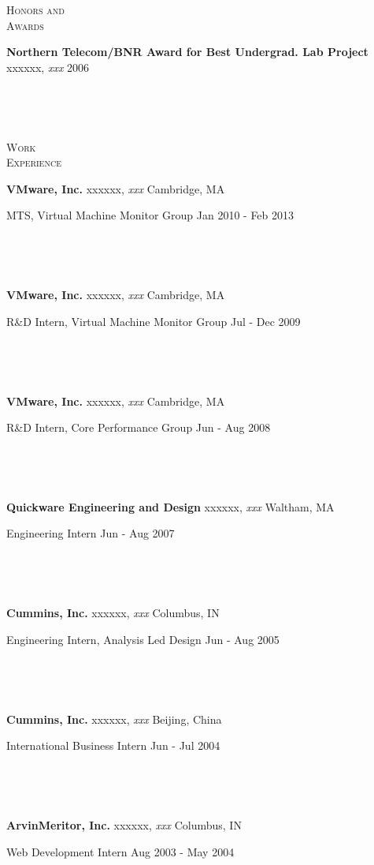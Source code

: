 \documentclass[10pt,times]{report}
\newlength{\sectiongap}
\newlength{\entrygap}
\newlength{\sectioncolwidth}
\newlength{\colgap}
\newlength{\stuffwidth}
\def\ifEqString#1#2{\def\testa{#1}\def\testb{#2}%
  \ifx\testa\testb}
\newenvironment{rtable}{
  \begin{minipage}{\textwidth}
  }{
  \end{minipage}
}
\newenvironment{rentry}[3][xxx]{
  \begin{minipage}[t]{\hsize}
    \textbf{#2}\ifEqString{#1}{xxx}\relax\else, \textit{#1}\fi
    \hspace{\stretch{1}} #3 \\
  }{
    \removelastskip
  \end{minipage}
  \\[\entrygap]  %
}
\newcommand{\rline}[2]{
  \begin{minipage}[t]{\hsize}
    #1 \hspace{\stretch{1}} #2
  \end{minipage} \\
}
\newenvironment{rsection}[1]{
  \begin{minipage}[t]{\sectioncolwidth}
    \textsc{#1}
  \end{minipage}
  \hspace{\colgap}
  \begin{minipage}[t]{\stuffwidth}
  }{
    \removelastskip
  \end{minipage}
  \\[\sectiongap]
}
\begin{document}
\begin{rtable}
\begin{rsection}{Honors and\\Awards}
    \begin{rentry}{Northern Telecom/BNR Award for Best Undergrad. Lab Project}{2006}
    \end{rentry}
  \end{rsection}
  \vspace{1.0em}
  \begin{rsection}{Work\\Experience}
    \begin{rentry}{VMware, Inc.}{Cambridge, MA}      
      \rline{MTS, Virtual Machine Monitor
        Group}{Jan 2010 - Feb 2013}
      \vspace{-.5em}
    \end{rentry}
    \begin{rentry}{VMware, Inc.}{Cambridge, MA}      
      \rline{R\&D Intern, Virtual Machine Monitor Group}{Jul - Dec 2009}
      \vspace{-.5em}
    \end{rentry}
    \begin{rentry}{VMware, Inc.}{Cambridge, MA}      
      \rline{R\&D Intern, Core Performance Group}{Jun - Aug 2008}
      \vspace{-.5em}
    \end{rentry}
    \begin{rentry}{Quickware Engineering and Design}{Waltham, MA}
      \rline{Engineering Intern}{Jun - Aug 2007} 
      \vspace{-.5em}
    \end{rentry}
    \begin{rentry}{Cummins, Inc.}{Columbus, IN}
      \rline{Engineering Intern, Analysis Led Design}{Jun - Aug 2005}
      \vspace{-.5em}
    \end{rentry}
    \begin{rentry}{Cummins, Inc.}{Beijing, China}
      \rline{International Business Intern}{Jun - Jul 2004} 
      \vspace{-.5em}
    \end{rentry}
    \begin{rentry}{ArvinMeritor, Inc.}{Columbus, IN}
      \rline{Web Development Intern}{Aug 2003 - May 2004}
      \vspace{-.5em}
    \end{rentry}
  \end{rsection}

  \vspace{-1em}  
\end{rtable}
\end{document}
